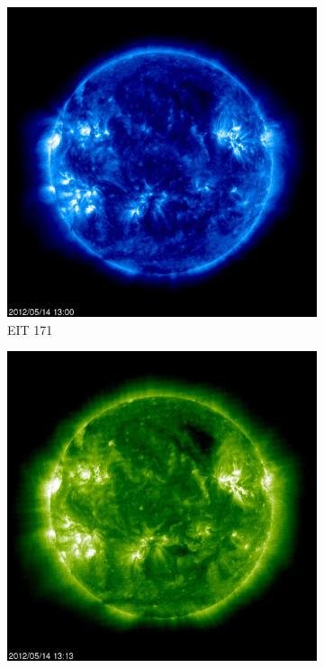 \documentclass{article}
\begin{document}
\begin{figure}[h!tb]
	\begin{subfigure}[b]{0.16\textwidth}
		\centering
		\includegraphics[width=\textwidth]{Figures/SOHOEIT171.jpg}
		\caption{EIT 171}
		\label{fig:SOHOEIT171}
	\end{subfigure}
	\begin{subfigure}[b]{0.16\linewidth}
		\centering
		\includegraphics[width=\textwidth]{Figures/SOHOEIT195.jpg}

\end{subfigure}
\end{figure}
\end{document}
